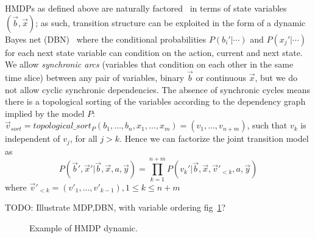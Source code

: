 HMDPs as defined above are naturally factored~\cite{boutilier99dt}
in terms of state variables $(\vec{b},\vec{x})$; as such,
transition structure can be exploited in the form of a dynamic Bayes
net (DBN)~\cite{dbn} where the conditional probabilities
$P(b_i'|\cdots)$ and $P(x_j'|\cdots)$ for each next state variable can
condition on the action, current and next state.  We allow  
\emph{synchronic arcs} (variables that condition on each
other in the same time slice) between any pair of variables, binary $\vec{b}$ or
continuous $\vec{x}$, but we do not allow cyclic synchronic dependencies. 
The absence of synchronic cycles means there is a topological sorting of the variables according to the dependency graph implied by the model $P$: $\vec{v}_{sort}=topological\_sort_{P}( b_1,\ldots,b_n,x_{1},\ldots,x_m ) =  ( v_1,\ldots, v_{n+m})$, such that $v_k$ is independent of $v_j$, for all $j >k$. Hence we can factorize the joint transition model as
{\footnotesize
\begin{equation}
P(\vec{b}',\vec{x}'|\vec{b},\vec{x},a,\vec{y}) = 
\prod_{k=1}^{n+m} P(v_k'| \vec{b},\vec{x}, \vec{v}'_{<k}, a,\vec{y}) \nonumber %
\end{equation}}
where $\vec{v}'_{<k} = ( v'_1,\ldots, v'_{k-1}), 1\leq k \leq n+m$

TODO: Illustrate MDP,DBN, with variable ordering fig~\ref{fig:hmdp}?

\begin{figure}[h!t]
\center
{}
\caption{ Example of HMDP dynamic.}
\label{fig:hmdp} 
\end{figure}

